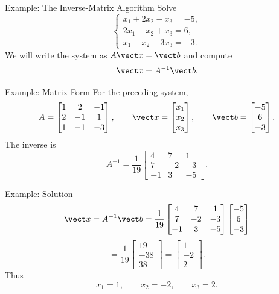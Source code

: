 \begin{frame}{Example: The Inverse-Matrix Algorithm}
Solve
\[
\begin{cases}
x_1+2x_2-x_3=-5,\\
2x_1-x_2+x_3=6,\\
x_1-x_2-3x_3=-3.
\end{cases}
\]
We will write the system as $A\vect x=\vect b$ and compute
\[
\vect x=A^{-1}\vect b.
\]
\end{frame}

\begin{frame}{Example: Matrix Form}
For the preceding system,
\[
A=\begin{bmatrix}
1&2&-1\\
2&-1&1\\
1&-1&-3
\end{bmatrix},\qquad
\vect x=\begin{bmatrix}x_1\\x_2\\x_3\end{bmatrix},\qquad
\vect b=\begin{bmatrix}-5\\6\\-3\end{bmatrix}.
\]
The inverse is
\[
A^{-1}=\frac1{19}
\begin{bmatrix}
4&7&1\\
7&-2&-3\\
-1&3&-5
\end{bmatrix}.
\]
\end{frame}

\begin{frame}{Example: Solution}
\[
\vect x=A^{-1}\vect b
=\frac1{19}
\begin{bmatrix}
4&7&1\\
7&-2&-3\\
-1&3&-5
\end{bmatrix}
\begin{bmatrix}-5\\6\\-3\end{bmatrix}
\]
\[
=\frac1{19}\begin{bmatrix}19\\-38\\38\end{bmatrix}
=\begin{bmatrix}1\\-2\\2\end{bmatrix}.
\]
Thus
\[
x_1=1,\qquad x_2=-2,\qquad x_3=2.
\]
\end{frame}

